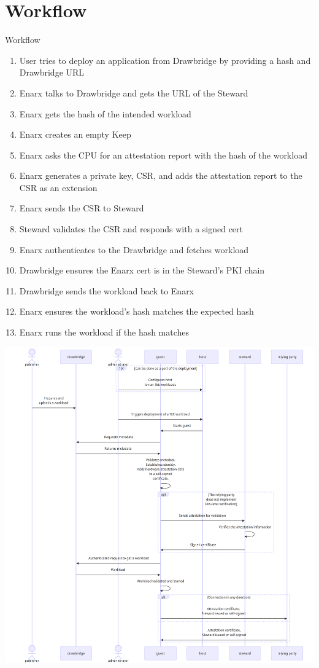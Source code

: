 \documentclass[graphics]{beamer}
\begin{document}
\section{Workflow}
\begin{frame}{Workflow}
     {
        \begin{enumerate}
            \item User tries to deploy an application from Drawbridge by providing a hash and Drawbridge URL
            \item Enarx talks to Drawbridge and gets the URL of the Steward
            \item Enarx gets the hash of the intended workload
            \item Enarx creates an empty Keep
            \item Enarx asks the CPU for an attestation report with the hash of the workload
            \item Enarx generates a private key, CSR, and adds the attestation report to the CSR as an extension
            \item Enarx sends the CSR to Steward
            \item Steward validates the CSR and responds with a signed cert
            \item Enarx authenticates to the Drawbridge and fetches workload
            \item Drawbridge ensures the Enarx cert is in the Steward's PKI chain
            \item Drawbridge sends the workload back to Enarx
            \item Enarx ensures the workload's hash matches the expected hash
            \item Enarx runs the workload if the hash matches
        \end{enumerate}
    }
     {
        \centering
        \includegraphics[width=1.01\linewidth,height=0.71\linewidth]{images/attestation-flow-mermaid.png}
    }
\end{frame}
\end{document}
